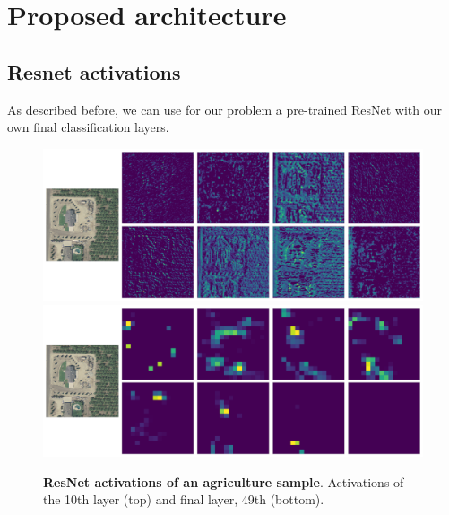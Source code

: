 \section{Proposed architecture}

\subsection{Resnet activations}

As described before, we can use for our problem a pre-trained ResNet with our own final classification layers.

\begin{figure}[h!]
	\centering
	\captionsetup{width=1\linewidth}
	\includegraphics[width=1\textwidth]{Figures/activations/agriculture_l2_s1_activation_10.png}
	\includegraphics[width=1\textwidth]{Figures/activations/agriculture_l2_s1_activation_49.png}
	\caption{\textbf{ResNet activations of an agriculture sample}. Activations of the 10th layer (top) and final layer, 49th (bottom).}
	\label{fig:degrade}
\end{figure}

